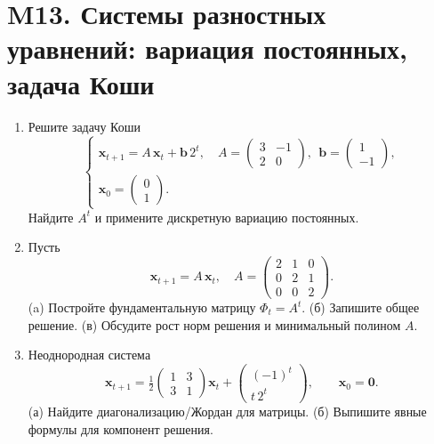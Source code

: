 \documentclass[12pt]{article}
\begin{document}
\section{M13. Системы разностных уравнений: вариация постоянных, задача Коши}
\begin{enumerate}
\item Решите задачу Коши
\[
\begin{cases}
\mathbf x_{t+1}=A\,\mathbf x_t+\mathbf b\,2^t,\quad
A=\begin{pmatrix}3&-1\\2&0\end{pmatrix},\ \ \mathbf b=\begin{pmatrix}1\\-1\end{pmatrix},\\[2mm]
\mathbf x_0=\begin{pmatrix}0\\1\end{pmatrix}.
\end{cases}
\]
Найдите $A^t$ и примените дискретную вариацию постоянных.

\item Пусть
\[
\mathbf x_{t+1}=A\,\mathbf x_t,\quad
A=\begin{pmatrix}2&1&0\\0&2&1\\0&0&2\end{pmatrix}.
\]
(a) Постройте фундаментальную матрицу $\Phi_t=A^t$. (б) Запишите общее решение. (в) Обсудите рост норм решения и минимальный полином $A$.

\item Неоднородная система
\[
\mathbf x_{t+1}=\tfrac12
\begin{pmatrix}
1&3\\
3&1
\end{pmatrix}\mathbf x_t+\begin{pmatrix}(-1)^t\\ t\,2^t\end{pmatrix},\qquad \mathbf x_0=\mathbf 0.
\]
(а) Найдите диагонализацию/Жордан для матрицы. (б) Выпишите явные формулы для компонент решения.
\end{enumerate}
\end{document}
